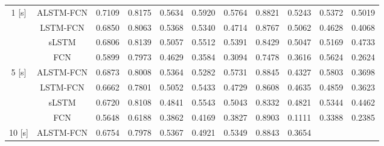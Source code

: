 \documentclass{ieeeaccess}
\begin{document}
\begin{table}[htbp!]
\begin{tabular*}{0.9\textwidth}{c|c|c|cccc|cccc}
\multirow{4}{*}{1   [s]} &
  ALSTM-FCN &
  0.7109 &
  \multicolumn{1}{c|}{0.8175} &
  \multicolumn{1}{c|}{0.5634} &
  \multicolumn{1}{c|}{0.5920} &
  0.5764 &
  \multicolumn{1}{c|}{0.8821} &
  \multicolumn{1}{c|}{0.5243} &
  \multicolumn{1}{c|}{0.5372} &
  0.5019 \\ \cline{2-11} 
 &
  LSTM-FCN &
  0.6850 &
  \multicolumn{1}{c|}{0.8063} &
  \multicolumn{1}{c|}{0.5368} &
  \multicolumn{1}{c|}{0.5340} &
  0.4714 &
  \multicolumn{1}{c|}{0.8767} &
  \multicolumn{1}{c|}{0.5062} &
  \multicolumn{1}{c|}{0.4628} &
  0.4068 \\ \cline{2-11} 
 &
  sLSTM &
  0.6806 &
  \multicolumn{1}{c|}{0.8139} &
  \multicolumn{1}{c|}{0.5057} &
  \multicolumn{1}{c|}{0.5512} &
  0.5391 &
  \multicolumn{1}{c|}{0.8429} &
  \multicolumn{1}{c|}{0.5047} &
  \multicolumn{1}{c|}{0.5169} &
  0.4733 \\ \cline{2-11} 
 &
  FCN &
  0.5899 &
  \multicolumn{1}{c|}{0.7973} &
  \multicolumn{1}{c|}{0.4629} &
  \multicolumn{1}{c|}{0.3584} &
  0.3094 &
  \multicolumn{1}{c|}{0.7478} &
  \multicolumn{1}{c|}{0.3616} &
  \multicolumn{1}{c|}{0.5624} &
  0.2624 \\ \hline
\multirow{4}{*}{5   [s]} &
  ALSTM-FCN &
  0.6873 &
  \multicolumn{1}{c|}{0.8008} &
  \multicolumn{1}{c|}{0.5364} &
  \multicolumn{1}{c|}{0.5282} &
  0.5731 &
  \multicolumn{1}{c|}{0.8845} &
  \multicolumn{1}{c|}{0.4327} &
  \multicolumn{1}{c|}{0.5803} &
  0.3698 \\ \cline{2-11} 
 &
  LSTM-FCN &
  0.6662 &
  \multicolumn{1}{c|}{0.7801} &
  \multicolumn{1}{c|}{0.5052} &
  \multicolumn{1}{c|}{0.5433} &
  0.4729 &
  \multicolumn{1}{c|}{0.8608} &
  \multicolumn{1}{c|}{0.4635} &
  \multicolumn{1}{c|}{0.4859} &
  0.3623 \\ \cline{2-11} 
 &
  sLSTM &
  0.6720 &
  \multicolumn{1}{c|}{0.8108} &
  \multicolumn{1}{c|}{0.4841} &
  \multicolumn{1}{c|}{0.5543} &
  0.5043 &
  \multicolumn{1}{c|}{0.8332} &
  \multicolumn{1}{c|}{0.4821} &
  \multicolumn{1}{c|}{0.5344} &
  0.4462 \\ \cline{2-11} 
 &
  FCN &
  0.5648 &
  \multicolumn{1}{c|}{0.6188} &
  \multicolumn{1}{c|}{0.3862} &
  \multicolumn{1}{c|}{0.4169} &
  0.3827 &
  \multicolumn{1}{c|}{0.8903} &
  \multicolumn{1}{c|}{0.1111} &
  \multicolumn{1}{c|}{0.3388} &
  0.2385 \\ \hline
\multirow{4}{*}{10 [s]} &
  ALSTM-FCN &
  0.6754 &
  \multicolumn{1}{c|}{0.7978} &
  \multicolumn{1}{c|}{0.5367} &
  \multicolumn{1}{c|}{0.4921} &
  0.5349 &
  \multicolumn{1}{c|}{0.8843} &
  \multicolumn{1}{c|}{0.3654} &

\end{tabular*}
\end{table}
\end{document}
